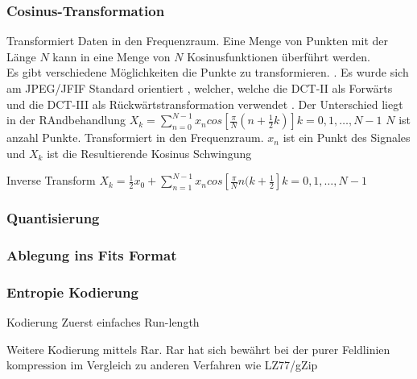 \subsubsection{Cosinus-Transformation} \label{konzept:loesung1:kosinus}
Transformiert Daten in den Frequenzraum. Eine Menge von Punkten mit der Länge $N$ kann in eine Menge von $N$ Kosinusfunktionen überführt werden.\\
Es gibt verschiedene Möglichkeiten die Punkte zu transformieren. . Es wurde sich am JPEG/JFIF Standard orientiert  , welcher, welche die DCT-II als Forwärts und die DCT-III als Rückwärtstransformation verwendet \cite{wallace1992jpeg}.
Der Unterschied liegt in der RAndbehandlung
$X_k = \sum_{n=0}^{N-1}x_n cos[\frac{\pi}{N}(n+\frac{1}{2}k)]
 k= 0,1,\ldots,N-1$
$N$ ist anzahl Punkte. Transformiert in den Frequenzraum. $x_n$ ist ein Punkt des Signales und $X_k$ ist die Resultierende Kosinus Schwingung%

Inverse Transform
$X_k = \frac{1}{2}x_0 + \sum_{n=1}^{N-1}x_n cos[\frac{\pi}{N}n(k+\frac{1}{2}]  k= 0,1,\ldots,N-1$

\subsubsection{Quantisierung}

\subsubsection{Ablegung ins Fits Format}

\subsubsection{Entropie Kodierung}\label{konzept:loesung1:kodierung}
Kodierung
	Zuerst einfaches Run-length

	Weitere Kodierung mittels Rar.
		Rar hat sich bewährt bei der purer Feldlinien kompression im Vergleich zu anderen Verfahren wie LZ77/gZip





